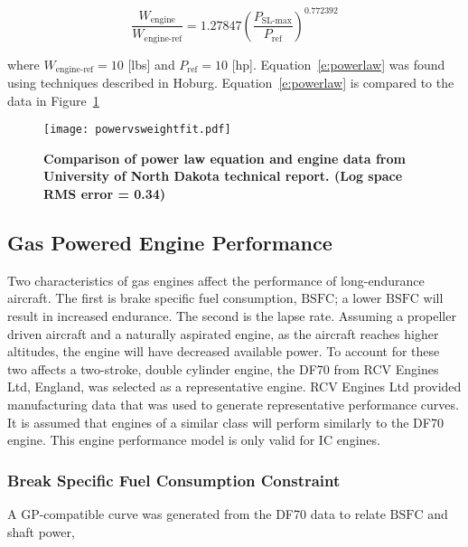 \documentclass[]{aiaa-tc}%
\begin{document}
\begin{equation}
    \label{e:powerlaw}
    \frac{W_{\text{engine}}}{W_{\text{engine-ref}}} = 1.27847 \left(\frac{P_{\text{SL-max}}}{P_{\text{ref}}} \right)^{0.772392}
\end{equation}

where $W_{\text{engine-ref}} = 10$ [lbs] and $P_{\text{ref}} = 10$ [hp].  Equation~\eqref{e:powerlaw} was found using techniques described in Hoburg\cite{fitting}. Equation~\eqref{e:powerlaw} is compared to the data in Figure~\ref{f:powervsweightfit}

\begin{figure}[H]
	\begin{center}
	\texttt{[image: powervsweightfit.pdf]}
    \caption{\textbf{Comparison of power law equation and engine data from University of North Dakota technical report.\cite{gasengine} (Log space RMS error = 0.34)}}
	\label{f:powervsweightfit}
	\end{center}
\end{figure}

\subsection{Gas Powered Engine Performance}

Two characteristics of gas engines affect the performance of long-endurance aircraft.  
The first is brake specific fuel consumption, $\text{BSFC}$; a lower $\text{BSFC}$ will result in increased endurance.  
The second is the lapse rate.  
Assuming a propeller driven aircraft and a naturally aspirated engine, as the aircraft reaches higher altitudes, the engine will have decreased available power. 
To account for these two affects a two-stroke, double cylinder engine, the DF70 from RCV Engines Ltd, England, was selected as a representative engine.  
RCV Engines Ltd provided manufacturing data that was used to generate representative performance curves.\cite{rcvengines}
It is assumed that engines of a similar class will perform similarly to the DF70 engine.  
This engine performance model is only valid for IC engines.

\subsubsection{Break Specific Fuel Consumption Constraint}

A GP-compatible curve was generated from the DF70 data to relate $\text{BSFC}$ and shaft power, 
\end{document}
